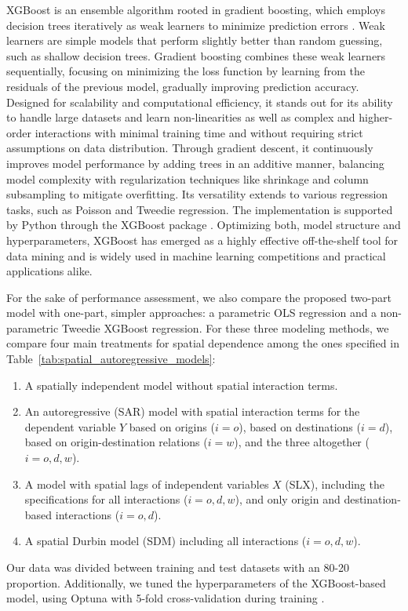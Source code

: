 XGBoost is an ensemble algorithm rooted in gradient boosting, which employs decision trees iteratively as weak learners to minimize prediction errors \citep{Chen2016XGBoost:System}. 
Weak learners are simple models that perform slightly better than random guessing, such as shallow decision trees. Gradient boosting combines these weak learners sequentially, focusing on minimizing the loss function by learning from the residuals of the previous model, gradually improving prediction accuracy. Designed for scalability and computational efficiency, it stands out for its ability to handle large datasets and learn non-linearities as well as complex and higher-order interactions with minimal training time and without requiring strict assumptions on data distribution.
Through gradient descent, it continuously improves model performance by adding trees in an additive manner, balancing model complexity with regularization techniques like shrinkage and column subsampling to mitigate overfitting. Its versatility extends to various regression tasks, such as Poisson and Tweedie regression. The implementation is supported by Python through the XGBoost package \citep{XGBoostcontributors2022XGBoostDocumentation}. Optimizing both, model structure and hyperparameters, XGBoost has emerged as a highly effective off-the-shelf tool for data mining and is widely used in machine learning competitions and practical applications alike.

For the sake of performance assessment, we also compare the proposed two-part model with one-part, simpler approaches: a parametric OLS regression and a non-parametric Tweedie XGBoost regression. For these three modeling methods, we compare four main treatments for spatial dependence among the ones specified in Table~\ref{tab:spatial_autoregressive_models}: 
\begin{enumerate}
    \item A spatially independent model without spatial interaction terms.
    \item An autoregressive (SAR) model with spatial interaction terms for the dependent variable $Y$ based on origins ($i=o$), based on destinations ($i=d$), based on origin-destination relations ($i=w$), and the three altogether ($i=o,d,w$).
    \item A model with spatial lags of independent variables $X$ (SLX), including the specifications for all interactions ($i=o,d,w$), and only origin and destination-based interactions ($i=o,d$). 
    \item A spatial Durbin model (SDM) including all interactions ($i=o,d,w$).
\end{enumerate}
Our data was divided between training and test datasets with an 80-20 proportion. Additionally, we tuned the hyperparameters of the XGBoost-based model, using Optuna with 5-fold cross-validation during training \citep{Akiba2019Optuna:Framework, Krasniqi2022ParametricFrequency}. 

